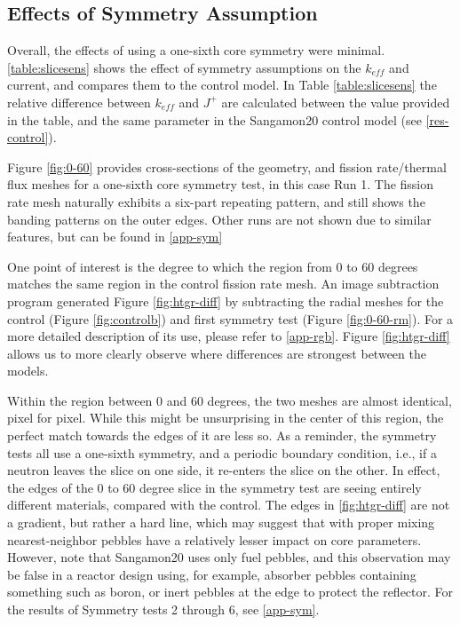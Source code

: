 \subsection{Effects of Symmetry Assumption}
\label{res-sym}

Overall, the effects of using a one-sixth core symmetry were minimal.  \ref{table:slicesens} shows the effect of symmetry assumptions on the $k_{eff}$ and current, and compares them to the control model.  In Table \ref{table:slicesens} the relative difference between $k_{eff}$ and $J^+$ are calculated between the value provided in the table, and the same parameter in the Sangamon20 control model (see \autoref{res-control}).




Figure \ref{fig:0-60} provides cross-sections of the geometry, and fission rate/thermal flux meshes for a one-sixth core symmetry test, in this case Run 1.  The fission rate mesh naturally exhibits a six-part repeating pattern, and still shows the banding patterns on the outer edges.   Other runs are not shown due to similar features, but can be found in \autoref{app-sym}



One point of interest is the degree to which the region from 0 to 60 degrees matches the same region in the control fission rate mesh.  An image subtraction program generated Figure \ref{fig:htgr-diff} by subtracting the radial meshes for the control (Figure \ref{fig:controlb}) and first symmetry test (Figure \ref{fig:0-60-rm}).  For a more detailed description of its use, please refer to \autoref{app-rgb}.  Figure \ref{fig:htgr-diff} allows us to more clearly observe where differences are strongest between the models.



Within the region between 0 and 60 degrees, the two meshes are almost identical, pixel for pixel.  While this might be unsurprising in the center of this region, the perfect match towards the edges of it are less so.  As a reminder, the symmetry tests all use a one-sixth symmetry, and a periodic boundary condition, i.e., if a neutron leaves the slice on one side, it re-enters the slice on the other.  In effect, the edges of the 0 to 60 degree slice in the symmetry test are seeing entirely different materials, compared with the control.  The edges in \ref{fig:htgr-diff} are not a gradient, but rather a hard line, which may suggest that with proper mixing nearest-neighbor pebbles have a relatively lesser impact on core parameters.  However, note that Sangamon20 uses only fuel pebbles, and this observation may be false in a reactor design using, for example, absorber pebbles containing something such as boron, or inert pebbles at the edge to protect the reflector.  For the results of Symmetry tests 2 through 6, see \autoref{app-sym}.


